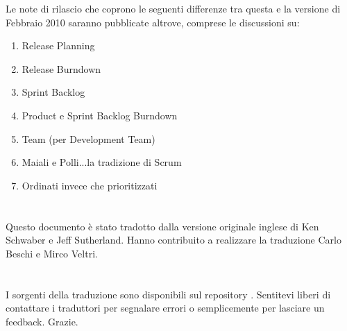 Le note di rilascio che coprono le seguenti differenze tra questa e la versione di Febbraio 2010 saranno pubblicate altrove, comprese le discussioni su:

\begin{enumerate}
 	\item Release Planning
	\item Release Burndown
	\item Sprint Backlog
	\item Product e Sprint Backlog Burndown
	\item Team (per Development Team)
	\item Maiali e Polli...la tradizione di Scrum
	\item Ordinati invece che prioritizzati 
\end{enumerate}

\newpage
\section*{\color{Blue}{Traduzione}}
\label{sec:translation}
Questo documento \`e stato tradotto dalla versione originale inglese di Ken Schwaber e Jeff Sutherland. Hanno contribuito a realizzare la traduzione Carlo Beschi e Mirco Veltri.

\section*{\color{Blue}{Note alla versione italiana}}
\label{sec:translationnotes}
I sorgenti della traduzione sono disponibili sul repository . 
Sentitevi liberi di contattare i traduttori per segnalare errori o semplicemente per lasciare un feedback. Grazie.
